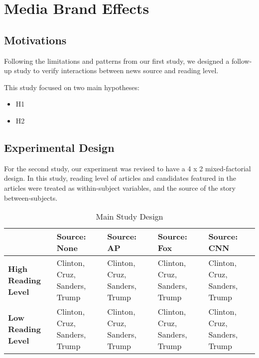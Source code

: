 \chapter{Media Brand Effects}

\section{Motivations}  
Following the limitations and patterns from our first study, we designed a follow-up study to verify interactions between news source and reading level.

This study focused on two main hypotheses:

\begin{itemize}
  \item H1
  \item H2
\end{itemize}


\section{Experimental Design}

For the second study, our experiment was revised to have a 4 x 2 mixed-factorial design.
In this study, reading level of articles and candidates featured in the articles were treated as within-subject variables, and the source of the story between-subjects.

\begin{center}
\begin{table}
\begin{tabular}{ | m{10em} | m{7em}| m{7em} | m{7em} | m{7em} | } 
 \hline
  & \textbf{Source: None} & \textbf{Source: AP} & \textbf{Source: Fox} & \textbf{Source: CNN} \\
 \hline
 \textbf{High Reading Level} & Clinton, Cruz, Sanders, Trump & Clinton, Cruz, Sanders, Trump & Clinton, Cruz, Sanders, Trump & Clinton, Cruz, Sanders, Trump  \\ 
 \textbf{Low Reading Level} & Clinton, Cruz, Sanders, Trump & Clinton, Cruz, Sanders, Trump & Clinton, Cruz, Sanders, Trump & Clinton, Cruz, Sanders, Trump \\ 
 \hline
\end{tabular}
\caption{Main Study Design}
\label{study2}
\end{table}
\end{center}



